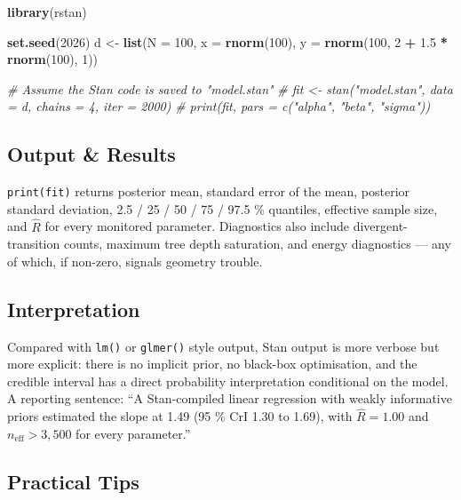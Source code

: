 \documentclass[
]{article}
\newenvironment{Shaded}{\begin{snugshade}}{\end{snugshade}}
\newcommand{\AttributeTok}[1]{\textcolor[rgb]{0.13,0.29,0.53}{#1}}
\newcommand{\CommentTok}[1]{\textcolor[rgb]{0.56,0.35,0.01}{\textit{#1}}}
\newcommand{\DecValTok}[1]{\textcolor[rgb]{0.00,0.00,0.81}{#1}}
\newcommand{\FloatTok}[1]{\textcolor[rgb]{0.00,0.00,0.81}{#1}}
\newcommand{\FunctionTok}[1]{\textcolor[rgb]{0.13,0.29,0.53}{\textbf{#1}}}
\newcommand{\NormalTok}[1]{#1}
\newcommand{\OtherTok}[1]{\textcolor[rgb]{0.56,0.35,0.01}{#1}}
\newcommand{\SpecialCharTok}[1]{\textcolor[rgb]{0.81,0.36,0.00}{\textbf{#1}}}
\begin{document}
\begin{Shaded}
\begin{Highlighting}[]
\FunctionTok{library}\NormalTok{(rstan)}

\FunctionTok{set.seed}\NormalTok{(}\DecValTok{2026}\NormalTok{)}
\NormalTok{d }\OtherTok{\textless{}{-}} \FunctionTok{list}\NormalTok{(}\AttributeTok{N =} \DecValTok{100}\NormalTok{, }\AttributeTok{x =} \FunctionTok{rnorm}\NormalTok{(}\DecValTok{100}\NormalTok{), }\AttributeTok{y =} \FunctionTok{rnorm}\NormalTok{(}\DecValTok{100}\NormalTok{, }\DecValTok{2} \SpecialCharTok{+} \FloatTok{1.5} \SpecialCharTok{*} \FunctionTok{rnorm}\NormalTok{(}\DecValTok{100}\NormalTok{), }\DecValTok{1}\NormalTok{))}

\CommentTok{\# Assume the Stan code is saved to "model.stan"}
\CommentTok{\# fit \textless{}{-} stan("model.stan", data = d, chains = 4, iter = 2000)}
\CommentTok{\# print(fit, pars = c("alpha", "beta", "sigma"))}
\end{Highlighting}
\end{Shaded}

\subsection{Output \& Results}\label{output-results}

\texttt{print(fit)} returns posterior mean, standard error of the mean,
posterior standard deviation, 2.5 / 25 / 50 / 75 / 97.5 \% quantiles,
effective sample size, and \(\hat R\) for every monitored parameter.
Diagnostics also include divergent-transition counts, maximum tree depth
saturation, and energy diagnostics --- any of which, if non-zero,
signals geometry trouble.

\subsection{Interpretation}\label{interpretation}

Compared with \texttt{lm()} or \texttt{glmer()} style output, Stan
output is more verbose but more explicit: there is no implicit prior, no
black-box optimisation, and the credible interval has a direct
probability interpretation conditional on the model. A reporting
sentence: ``A Stan-compiled linear regression with weakly informative
priors estimated the slope at 1.49 (95 \% CrI 1.30 to 1.69), with
\(\hat R = 1.00\) and \(n_{\text{eff}} > 3{,}500\) for every
parameter.''

\subsection{Practical Tips}\label{practical-tips}
\end{document}
